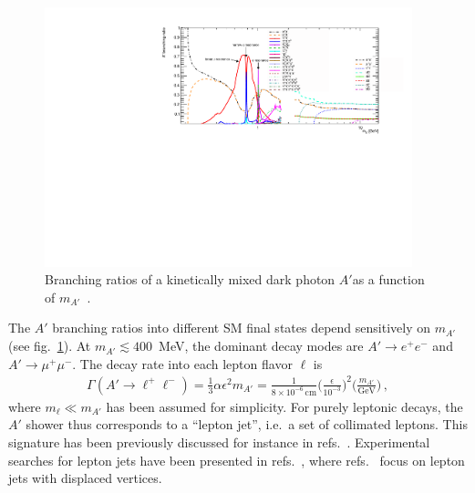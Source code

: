 \begin{figure}
  \begin{center}
    \includegraphics[width=0.95\textwidth]{figures/DS_DarkPhoton_BR.pdf}
  \end{center}
  \vspace{-0.7cm}
  \caption{Branching ratios of a kinetically mixed dark photon $A'$as a
    function of $m_{A'}$~\cite{Buschmann:2015awa}.}
  \label{fig:radiating-dm-BR}
\end{figure}

The $A'$ branching ratios into different SM final states depend sensitively on
$m_{A'}$ (see fig.~\ref{fig:radiating-dm-BR}).  At $m_{A'} \lesssim 400$~MeV, the dominant
decay modes are $A' \to e^+e^-$ and $A' \to \mu^+ \mu^-$. The decay
rate into each lepton flavor $\ell$ is
\begin{align}
  \Gamma(A' \to \ell^+\ell^-) =
    \frac{1}{3} \alpha \epsilon^2 m_{A'}
    = \frac{1}{8 \times 10^{-6}\,\text{cm}}
      \bigg( \frac{\epsilon}{10^{-3}} \bigg)^2
      \bigg( \frac{m_{A'}}{\text{GeV}} \bigg) \,,
\end{align}
where $m_\ell \ll m_{A'}$ has been assumed for simplicity.
For purely leptonic decays, the $A'$ shower thus corresponds to a ``lepton
jet'', i.e.\ a set of collimated leptons. This signature has been
previously discussed for instance in refs.~\cite{ArkaniHamed:2008qp,
Cheung:2009su, Katz:2009qq, Bai:2009it, Baumgart:2009tn, Chan:2011aa,
Falkowski:2010gv, Curtin:2013fra, Gupta:2015lfa, Autran:2015mfa}.
Experimental searches for lepton jets have been presented in
refs.~\cite{Aad:2014yea, Aad:2015sms, ATLAS:2016jza, Khachatryan:2015wka},
where refs.~\cite{Aad:2014yea, ATLAS:2016jza} focus on lepton jets with
displaced vertices.

